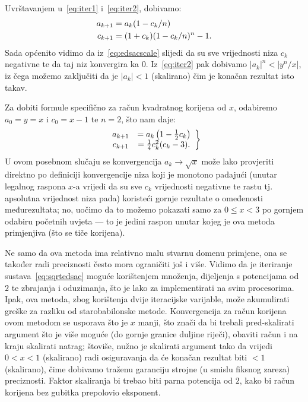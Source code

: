 \documentclass[12pt]{scrartcl}
\begin{document}
Uvrštavanjem u~\eqref{eq:iter1} i~\eqref{eq:iter2}, dobivamo:
\begin{align}
    a_{k+1} &= a_k(1-c_k/n)\\
    c_{k+1} &= (1+c_k)(1-c_k/n)^n - 1\text.
\end{align}
Sada općenito vidimo da iz~\eqref{eq:edsacscale} slijedi
da su sve vrijednosti niza $c_k$ negativne te da taj niz konvergira ka $0$. Iz~\eqref{eq:iter2} pak dobivamo
$|a_k|^n<|y^n/x|$, iz čega možemo zaključiti da je $|a_k|<1$ (skalirano) čim je konačan rezultat isto takav.

Za dobiti formule specifično za račun kvadratnog korijena od $x$, odabiremo $a_0=y=x$ i $c_0=x-1$ te $n=2$, što nam daje:
\begin{equation}
\left.
    \begin{array}{cc}
    \label{eq:sqrtedsac}
        a_{k+1} &= a_k\left(1-\frac12 c_k\right)\\
        c_{k+1} &= \frac14 c^2_k(c_k-3)\text.
\end{array}\right\}
\end{equation}
U ovom posebnom slučaju se konvergencija $a_k\to\sqrt x$ može lako provjeriti direktno po definiciji konvergencije
niza koji je monotono padajući (unutar legalnog raspona $x$-a vrijedi da su sve $c_k$ vrijednosti negativne te rastu tj.
apsolutna vrijednost niza pada) koristeći gornje rezultate o omeđenosti međurezultata; no, uočimo da to možemo pokazati
samo za $0\leq x<3$ po gornjem odabiru početnih uvjeta --- to je jedini raspon unutar kojeg je ova metoda primjenjiva (što se tiče korijena).

Ne samo da ova metoda ima relativno malu stvarnu domenu primjene, ona se također radi preciznosti često mora ograničiti još i više.
Vidimo da je iteriranje sustava~\eqref{eq:sqrtedsac} moguće korištenjem množenja, dijeljenja s potencijama od $2$ te zbrajanja i oduzimanja, što
je lako za implementirati na svim procesorima. Ipak, ova metoda, zbog korištenja dvije iteracijske varijable, može akumulirati greške za razliku
od starobabilonske metode. Konvergencija za račun korijena ovom metodom se usporava što je $x$ manji, što znači da bi trebali pred-skalirati argument
što je više moguće (do gornje granice duljine riječi), obaviti račun i na kraju skalirati natrag; štoviše, nužno je
skalirati argument tako da vrijedi $0<x<1$ (skalirano) radi osiguravanja da će konačan rezultat biti $<1$ (skalirano), čime dobivamo
traženu garanciju strojne (u smislu fiksnog zareza) preciznosti. 
Faktor skaliranja bi trebao biti parna potencija od $2$,
kako bi račun korijena bez gubitka prepolovio eksponent.
\end{document}

